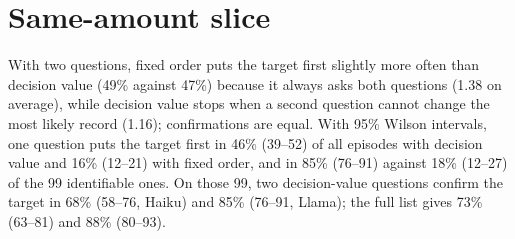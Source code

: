 \documentclass[11pt]{article}
\begin{document}
\begin{table}[H]
\centering\small
\setlength{\tabcolsep}{2.6pt}
\caption{Decision value with a budget of two, eight records, mixed personas (\%). ``One
reliability'' sets every attribute's $a_k$ to the same value; every value from 0.6 to 0.99 gives
the same row. Random draws set each $a_k$ independently between 0.6 and 0.99.}
\label{tab:studies}
\end{table}

\section{Same-amount slice}
\label{app:same}

With two questions, fixed order puts the target first slightly more often than decision value
(49\% against 47\%) because it always asks both questions (1.38 on average), while decision value
stops when a second question cannot change the most likely record (1.16); confirmations are equal.
With 95\% Wilson intervals, one question puts the target first in 46\% (39--52) of all episodes
with decision value and 16\% (12--21) with fixed order, and in 85\% (76--91) against 18\% (12--27)
of the 99 identifiable ones. On those 99, two decision-value questions confirm the target in 68\%
(58--76, Haiku) and 85\% (76--91, Llama); the full list gives 73\% (63--81) and 88\% (80--93).
\end{document}
